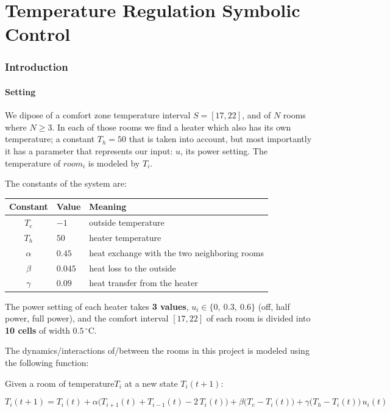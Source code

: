 \documentclass[11pt,a4paper]{article}
\begin{document}
\part{Temperature Regulation Symbolic Control}


\section{Introduction}

\subsection{Setting}
We dipose of a comfort zone temperature interval $S=[17,22]$, and of $N$ rooms where $N\ge3$. In each of those rooms we find a heater which also has its own temperature; a constant $T_h = 50$ that is taken into account, but most importantly it has a parameter that represents our input: $u$, its power setting. The temperature of $room_i$ is modeled by $T_i$.

The constants of the system are:

\begin{center}
\renewcommand{\arraystretch}{1.2}
\begin{tabular}{@{}clp{8cm}@{}}
\toprule
Constant & Value & Meaning \\
\midrule
$T_e$ & $-1$ & outside temperature \\
$T_h$ & $50$ & heater temperature \\
$\alpha$ & $0.45$ & heat exchange with the two neighboring rooms \\
$\beta$ & $0.045$ & heat loss to the outside \\
$\gamma$ & $0.09$ & heat transfer from the heater \\
\bottomrule
\end{tabular}
\end{center}

The power setting of each heater takes \textbf{3 values}, $u_i \in \{0,\ 0.3,\ 0.6\}$ (off, half power, full power), and the comfort interval $[17,22]$ of each room is divided into \textbf{10 cells} of width $0.5\,^\circ\text{C}$.

The dynamics/interactions of/between the rooms in this project is modeled using the following function:

Given a room of temperature$T_i$ at a new state $T_i(t+1)$:

\[
T_i(t+1) = T_i(t) + \alpha\big(T_{i+1}(t) + T_{i-1}(t) - 2\,T_i(t)\big) + \beta\big(T_e - T_i(t)\big) + \gamma\big(T_h - T_i(t)\big)\,u_i(t)
\]
\end{document}
